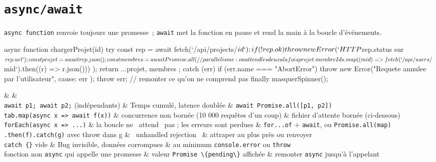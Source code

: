 \section{\texttt{async/await}}

\verb|async function| renvoie toujours une promesse~; \verb|await| met la fonction en pause
et rend la main \`a la boucle d'\'ev\'enements.

\begin{codejs}
async function chargerProjet(id) {
  try {
    const rep = await fetch(`/api/projects/${id}`);
    if (!rep.ok) throw new Error(`HTTP ${rep.status} sur ${rep.url}`);
    const projet = await rep.json();
    const membres = await Promise.all(              // parallelisme : on attend les deux a la fois
      projet.membreIds.map((mid) => fetch(`/api/users/${mid}`).then((r) => r.json()))
    );
    return { ...projet, membres };
  } catch (err) {
    if (err.name === "AbortError") throw new Error("Requete annulee par l'utilisateur", { cause: err });
    throw err;                                       // remonter ce qu'on ne comprend pas
  } finally {
    masquerSpinner();
  }
}
\end{codejs}

\begin{tablez}[p{0.2\textwidth}XX]
  \headrow {} \&  \&  \\
  \midrule
  \verb|await p1; await p2;| (ind\'ependants) \& Temps cumul\'e, latence doubl\'ee \& \verb|await Promise.all([p1, p2])| \\
  \verb|tab.map(async x => await f(x))| \& concurrence non born\'ee (10 000 requ\^etes d'un coup) \& fichier d'attente born\'ee (ci-dessous) \\
  \verb|forEach(async x => ...)| \& la boucle ne \og ~attend~ \fg{} pas ; les erreurs sont perdues \& \verb|for...of| + \verb|await|, ou \verb|Promise.all(map)| \\
  \verb|.then(f).catch(g)| avec throw dans g \& \og ~unhandled rejection~ \fg{} \& attraper au plus pr\`es ou renvoyer \\
  \verb|catch {}| vide \& Bug invisible, donn\'ees corrompues \& au minimum \verb|console.error| ou \verb|throw| \\
  fonction non \verb|async| qui appelle une promesse \& valeur \verb|Promise \{pending\}| affich\'ee \& remonter \verb|async| jusqu'\`a l'appelant \\
\end{tablez}


